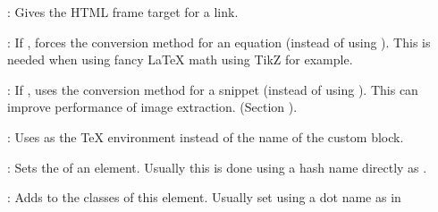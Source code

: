 \documentclass{book}
\begin{document}
\begin{mdUl}[class={list-star,compact},data-line={3367}]
\begin{mdLi}[data-line={3375}]
{}%
{}: Gives the HTML frame target for a link.%
\end{mdLi}%
\begin{mdLi}[data-line={3376}]%
{}%
{}: If %
{}%
{}, forces the %
{}%
{} conversion method for an equation (instead
  of using %
{}%
{}). This is needed when using fancy LaTeX math using TikZ for example.%
\end{mdLi}%
\begin{mdLi}[data-line={3378}]%
{}%
{}: If %
{}%
{}, uses the %
{}%
{} conversion method for a snippet (instead
  of using %
{}%
{}). This can improve performance of image extraction. (Section%
{}{\mdNbsp}%
{}).%
\end{mdLi}%
\begin{mdLi}[data-line={3380}]%
{}%
{}%
{}: Uses %
{}%
{} as the TeX environment instead of the name of the custom
  block.%
\end{mdLi}%
\begin{mdLi}[data-line={3382}]%
{}%
{}%
{}: Sets the %
{}%
{} of an element. Usually this is done using a hash name directly
  as %
{}\mdCode[class={code,code1}]{\#}%
{}%
{}.%
\end{mdLi}%
\begin{mdLi}[data-line={3384}]%
{}%
{}%
{}: Adds to the classes of this element. Usually set using a dot name 
  as in %
{}%
{}%

\end{mdLi}
\end{mdUl}
\end{document}
